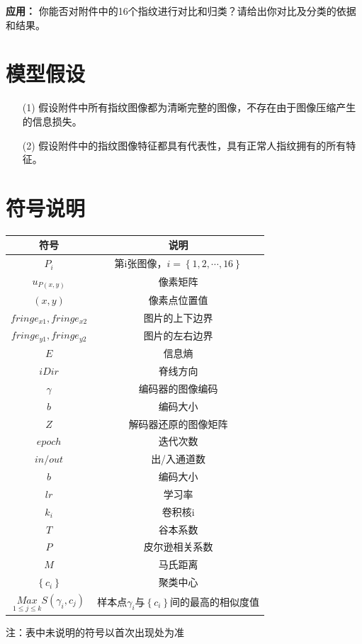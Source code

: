 \documentclass{whutmod}
\begin{document}
			\textbf{应用：} 你能否对附件中的16个指纹进行对比和归类？请给出你对比及分类的依据和结果。

	\section{模型假设}
		\begin{itemize}    
	\item [(1)] 假设附件中所有指纹图像都为清晰完整的图像，不存在由于图像压缩产生的信息损失。
\item [(2)] 假设附件中的指纹图像特征都具有代表性，具有正常人指纹拥有的所有特征。
		\end{itemize}

	\section{符号说明}
		\begin{table}[H]
		\centering
		\setlength{\tabcolsep}{12mm}
		\begin{tabular}{cc}
			\toprule[1.5pt]
			\multicolumn{1}{m{5cm}}{\centering 符号} & \multicolumn{1}{m{5cm}}{\centering 说明} \\
			\midrule[1pt]		
$P_{i}$  & 第i张图像，$i=\left\{1, 2, \cdots, 16\right\}$  \\ 
$u_{P(x,y)}$& 像素矩阵 \\
$(x,y)$  & 像素点位置值  \\ 
$fringe_{x1}, fringe_{x2}$  & 图片的上下边界  \\ 
$fringe_{y1}, fringe_{y2}$  & 图片的左右边界  \\ 
$E$  & 信息熵  \\ 
$iDir$  &  脊线方向 \\ 
$\gamma$  & 编码器的图像编码  \\ 
$b$  & 编码大小  \\ 
$Z$  & 解码器还原的图像矩阵  \\ 
$epoch$  & 迭代次数  \\ 
$in/out$  & 出/入通道数  \\ 
  	$b$  & 编码大小  \\ 
$lr$  & 学习率  \\ 
$k_i$  & 卷积核i  \\ 
$T$  & 谷本系数  \\ 
$P$  & 皮尔逊相关系数  \\ 
$M$  &  马氏距离 \\ 
$\left \{ c_i \right \}$  &  聚类中心 \\ 
$\underset{1\leqslant j\leqslant k}{Max}S(\gamma _i,c_j)$&样本点$ \gamma_i $与$\left \{ c_i \right \}$间的最高的相似度值\\
			\bottomrule[1.5pt]
		\end{tabular}
		\begin{tablenotes}
		\item 注：表中未说明的符号以首次出现处为准
		\end{tablenotes}
		\end{table}
\end{document}
